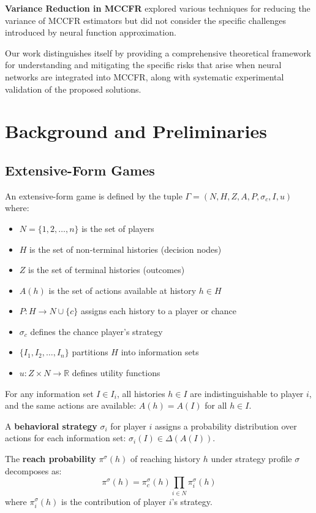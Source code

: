 \documentclass[12pt,a4paper]{article}
\begin{document}
\textbf{Variance Reduction in MCCFR} \citep{schmid2019variance} explored various techniques for reducing the variance of MCCFR estimators but did not consider the specific challenges introduced by neural function approximation.

Our work distinguishes itself by providing a comprehensive theoretical framework for understanding and mitigating the specific risks that arise when neural networks are integrated into MCCFR, along with systematic experimental validation of the proposed solutions.

\section{Background and Preliminaries}

\subsection{Extensive-Form Games}

An extensive-form game is defined by the tuple $\Gamma = (N, H, Z, A, P, \sigma_c, I, u)$ where:

\begin{itemize}
\item $N = \{1, 2, \ldots, n\}$ is the set of players
\item $H$ is the set of non-terminal histories (decision nodes)
\item $Z$ is the set of terminal histories (outcomes)
\item $A(h)$ is the set of actions available at history $h \in H$
\item $P: H \rightarrow N \cup \{c\}$ assigns each history to a player or chance
\item $\sigma_c$ defines the chance player's strategy
\item $\{I_1, I_2, \ldots, I_n\}$ partitions $H$ into information sets
\item $u: Z \times N \rightarrow \mathbb{R}$ defines utility functions
\end{itemize}

For any information set $I \in I_i$, all histories $h \in I$ are indistinguishable to player $i$, and the same actions are available: $A(h) = A(I)$ for all $h \in I$.

A \textbf{behavioral strategy} $\sigma_i$ for player $i$ assigns a probability distribution over actions for each information set: $\sigma_i(I) \in \Delta(A(I))$.

The \textbf{reach probability} $\pi^\sigma(h)$ of reaching history $h$ under strategy profile $\sigma$ decomposes as:
$$\pi^\sigma(h) = \pi_c^\sigma(h) \prod_{i \in N} \pi_i^\sigma(h)$$
where $\pi_i^\sigma(h)$ is the contribution of player $i$'s strategy.
\end{document}
